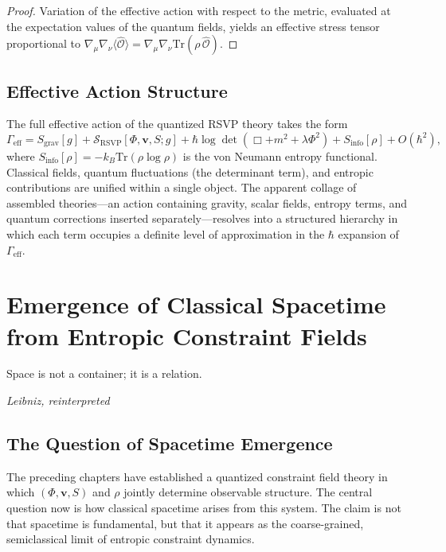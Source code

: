 \documentclass[12pt,a4paper,openany]{book}
\theoremstyle{plain}
\theoremstyle{definition}
\theoremstyle{remark}
\begin{document}
\begin{proof}
Variation of the effective action with respect to the metric, evaluated at the expectation values of the quantum fields, yields an effective stress tensor proportional to $\nabla_\mu\nabla_\nu\langle\hat{\mathcal{O}}\rangle = \nabla_\mu\nabla_\nu\mathrm{Tr}(\rho\,\hat{\mathcal{O}})$.
\end{proof}

\section{Effective Action Structure}

The full effective action of the quantized RSVP theory takes the form
\[
\Gamma_{\mathrm{eff}} = S_{\mathrm{grav}}[g] + \mathcal{S}_{\mathrm{RSVP}}[\Phi,\mathbf{v},S;g] + \hbar\log\det(\Box + m^2 + \lambda\Phi^2) + S_{\mathrm{info}}[\rho] + O(\hbar^2),
\]
where $S_{\mathrm{info}}[\rho] = -k_B\mathrm{Tr}(\rho\log\rho)$ is the von Neumann entropy functional. Classical fields, quantum fluctuations (the determinant term), and entropic contributions are unified within a single object. The apparent collage of assembled theories---an action containing gravity, scalar fields, entropy terms, and quantum corrections inserted separately---resolves into a structured hierarchy in which each term occupies a definite level of approximation in the $\hbar$ expansion of $\Gamma_{\mathrm{eff}}$.

\chapter{Emergence of Classical Spacetime from Entropic Constraint Fields}
\label{chap:emergent_spacetime}

\epigraph{%
  Space is not a container; it is a relation.
}{%
  \textit{Leibniz, reinterpreted}}

\section{The Question of Spacetime Emergence}

The preceding chapters have established a quantized constraint field theory in which $(\Phi,\mathbf{v},S)$ and $\rho$ jointly determine observable structure. The central question now is how classical spacetime arises from this system. The claim is not that spacetime is fundamental, but that it appears as the coarse-grained, semiclassical limit of entropic constraint dynamics.
\end{document}
